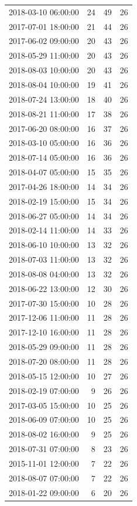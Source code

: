 \begin{tabular}{lrrr}
2018-03-10 06:00:00 & 24 & 49 & 26 \\
2017-07-01 18:00:00 & 21 & 44 & 26 \\
2017-06-02 09:00:00 & 20 & 43 & 26 \\
2018-05-29 11:00:00 & 20 & 43 & 26 \\
2018-08-03 10:00:00 & 20 & 43 & 26 \\
2018-08-04 10:00:00 & 19 & 41 & 26 \\
2018-07-24 13:00:00 & 18 & 40 & 26 \\
2018-08-21 11:00:00 & 17 & 38 & 26 \\
2017-06-20 08:00:00 & 16 & 37 & 26 \\
2018-03-10 05:00:00 & 16 & 36 & 26 \\
2018-07-14 05:00:00 & 16 & 36 & 26 \\
2018-04-07 05:00:00 & 15 & 35 & 26 \\
2017-04-26 18:00:00 & 14 & 34 & 26 \\
2018-02-19 15:00:00 & 15 & 34 & 26 \\
2018-06-27 05:00:00 & 14 & 34 & 26 \\
2018-02-14 11:00:00 & 14 & 33 & 26 \\
2018-06-10 10:00:00 & 13 & 32 & 26 \\
2018-07-03 11:00:00 & 13 & 32 & 26 \\
2018-08-08 04:00:00 & 13 & 32 & 26 \\
2018-06-22 13:00:00 & 12 & 30 & 26 \\
2017-07-30 15:00:00 & 10 & 28 & 26 \\
2017-12-06 11:00:00 & 11 & 28 & 26 \\
2017-12-10 16:00:00 & 11 & 28 & 26 \\
2018-05-29 09:00:00 & 11 & 28 & 26 \\
2018-07-20 08:00:00 & 11 & 28 & 26 \\
2018-05-15 12:00:00 & 10 & 27 & 26 \\
2018-02-19 07:00:00 & 9 & 26 & 26 \\
2017-03-05 15:00:00 & 10 & 25 & 26 \\
2018-06-09 07:00:00 & 10 & 25 & 26 \\
2018-08-02 16:00:00 & 9 & 25 & 26 \\
2018-07-31 07:00:00 & 8 & 23 & 26 \\
2015-11-01 12:00:00 & 7 & 22 & 26 \\
2018-08-07 07:00:00 & 7 & 22 & 26 \\
2018-01-22 09:00:00 & 6 & 20 & 26 \\

\end{tabular}
